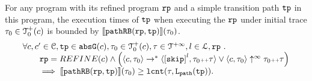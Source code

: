 \begin{lemma}
  For any program with its refined program $\mathtt{rp}$ and a simple transition path $\mathtt{tp}$ in this program,
  the execution times of $\mathtt{tp}$ when executing the $\mathtt{rp}$ under initial trace $\mathtt{\tau}_0 \in \mathcal{T}^{+}_0(c)$ is bounded by $\llbracket \mathtt{pathRB}(\mathtt{rp}, \mathtt{tp}) \rrbracket(\mathtt{\tau}_0)$.
  \[
    \begin{array}{l}
    \forall c, c' \in \cdom, \tpath \in \absG(c), \trace_0 \in \ftdom_0(c), \trace \in \tdom, l \in \ldom, \rprog \st 
    \\ \qquad
    \rprog = REFINE(c)
    \land
    \Big(
    \config{c, \trace_0} \rightarrow^* \config{\clabel{\eskip}^{l}, \trace_0 \tracecat \trace}
    \lor \config{c, \trace_0} \uparrow^{\infty} \trace_0 \tracecat \trace 
    \Big)
    \\ \qquad
    \implies
    \econfig{\inoutB(\rprog, \tpath)}(\trace_0) \geq \lcounter(\trace, \pathl(\tpath)).
    \end{array}
  \]
\end{lemma}
%
